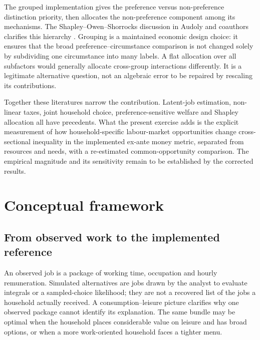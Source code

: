 \documentclass[11pt,a4paper]{article}
\begin{document}
The grouped implementation gives the preference versus non-preference distinction priority, then allocates the non-preference component among its mechanisms. The Shapley--Owen--Shorrocks discussion in Audoly and coauthors clarifies this hierarchy \citep{audoly2025}. Grouping is a maintained economic design choice: it ensures that the broad preference--circumstance comparison is not changed solely by subdividing one circumstance into many labels. A flat allocation over all subfactors would generally allocate cross-group interactions differently. It is a legitimate alternative question, not an algebraic error to be repaired by rescaling its contributions.

Together these literatures narrow the contribution. Latent-job estimation, non-linear taxes, joint household choice, preference-sensitive welfare and Shapley allocation all have precedents. What the present exercise adds is the explicit measurement of how household-specific labour-market opportunities change cross-sectional inequality in the implemented ex-ante money metric, separated from resources and needs, with a re-estimated common-opportunity comparison. The empirical magnitude and its sensitivity remain to be established by the corrected results.

\section{Conceptual framework}\label{conceptual-framework}

\subsection{From observed work to the implemented reference}\label{from-observed-work-to-the-implemented-reference}

An observed job is a package of working time, occupation and hourly remuneration. Simulated alternatives are jobs drawn by the analyst to evaluate integrals or a sampled-choice likelihood; they are not a recovered list of the jobs a household actually received. A consumption--leisure picture clarifies why one observed package cannot identify its explanation. The same bundle may be optimal when the household places considerable value on leisure and has broad options, or when a more work-oriented household faces a tighter menu.
\end{document}
